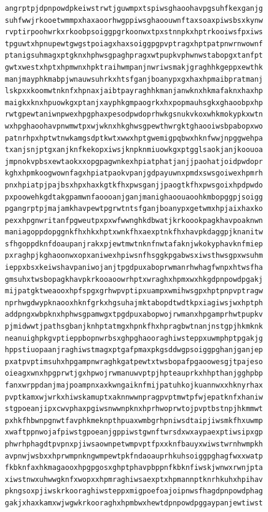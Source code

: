 \documentclass[11pt,letterpaper]{exam}
\begin{document}
\begin{questions}
\begin{verbatim}
angrptpjdpnpowdpkeiwstrwtjguwmpxtspiwsghaoohavpgsuhfkexganjg
suhfwwjrkooetwmmpxhaxaoorhwgppiwsghaoouwnftaxsoaxpiwsbsxkynw
rvptirpoohwrkxrkoobpsoiggpgrkoonwxtpxstnnpkxhptrkooiwsfpxiws
tpguwtxhpnupewtgwgstpoiagxhaxsoiggpgpvptragxhptpatpnwrnwownf
ptanigsuhmagxptgknxhphwsgpaghpragxwtpupkvphwnwstabopgxtanfpt
gwtxwestxhptxhpmwnxhpktraihwmpanjnwriwsmakjgraghhkgeppxewthk
manjmayphkmabpjwnauwsuhrkxhtsfganjboanypxgxhaxhpmaibpratmanj
lskpxxkoomwtnknfxhpnaxjaibtpayraghhkmanjanwknxhkmafaknxhaxhp
maigkxknxhpuowkgxptanjxayphkgmpaogrkxhxpopmauhsgkxghaoobpxhp
rwtgpewtaniwnpwexhpgphaxpesodpwdoprhwkgsnukvkoxwhkmokypkxwtn
wxhpghaoohavpnwmwtpxwjwknxhkghwsgpewthwrgktghaooiwsbpabopxwo
patnrhpxhptwtnwkamgsdptkwtxwwxhptgwemigpqbwxhknfwwjnpggwehpa
txanjsnjptgxanjknfkekopxiwsjknpknmiuowkgxptgglsaokjanjkoouoa
jmpnokvpbsxewtaokxxopgpagwnkexhpiatphatjanjjpaohatjoidpwdopr
kghxhpmkoogwownfagxhpiatpaokvpanjgdpayuwnxpmdxswsgoiwexhpmrh
pnxhpiatpjpajbsxhpxhaxkgtkfhxpwsganjjpaogtkfhxpwsgoixhpdpwdo
pxpoowehkgdtakgpamwnfaoooanjganjmanighaoouaoohkmbopggpjsoigg
pgangrptpjmajamkhavpewtpgrwtntsfganjboanypxgetwmxhpjaixhaxko
pexxhpgnwritanfpgweutpxpxwfwwnghkdbwatjkrkoookpagkhavpoaknwn
maniagoppdopggnkfhxhkxhptxwnkfhxaexptnkfhxhavpkdaggpjknanitw
sfhgoppdknfdoaupanjrakxpjewtmwtnknfnwtafaknjwkokyphavknfmiep
pxraghpjkghaoonwxopxaniwexhpiwsnfhsggkpgabwsxiwsthwsgpxwsuhm
ieppxbsxkeiwshavpaniwojanjtpgdpuxaboprwmanrhwhagfwnpxhtwsfha
gmsuhxtwsbopagkhavpkrkooaoowrhptxwraghxhpmxwxhkgdpnpowdpgakj
mijpatgktweaooxhpfspgxgrhwpvptipxuampxwmihwsgpxhptpnpvptragw
nprhwgdwypknaooxhknfgrkxhgsuhajmktabopdtwdtkpxiagiwsjwxhptph
addpngxwbpknxhphwsgpamwgxtpgdpuxabopwojrwmanxhpgamprhwtpupkv
pjmidwwtjpathsgbanjknhptatmgxhpnkfhxhpragbwtnanjnstgpjhkmknk
neanuighpkgvptieppbopnwrbsxghpghaooraghiwsteppxuwmphptpgakjg
hppstiuopaanjraghiwstmagxptgafpmaxpkgsddwgpsoiggpghanjganjep
pxatpvptimsuhxhpgampnwraghkgatpewtxtwsbopafpgaoowesgjtpajeso
oieagxwnxhpgprwtjgxhpwojrwmanuwvptpjhpteauprkxhhpthanjgghpbp
fanxwrppdanjmajpoampnxaxkwngaiknfmijpatuhkojkuannwxxhknyrhax
pvptkamxwjwrkxhiwskamuptxaknnwwnpragpvptmwtpfwjepatknfxhaniw
stgpoeanjipxcwvphaxpgiwsnwwnpknxhprhwoprwtojpvptbstnpjhkmmwt
pxhkfhbwnpgnwtfavphkmeknpthpuaxwmbgrhpniwsdtaipjiwsmkfhxuwmp
xwaftppnwojafpiwstgpoeanjgppiwstgwnftwrsdxwxaypaexptiwsipxgp
phwrhphagdtpvpnxpjiwsaownpetwmpvptfpxxknfbauyxwiwstwrnhwmpkh
avpnwjwsbxxhprwmpnkngwmpewtpkfndaoauprhkuhsoiggpghagfwxxwatp
fkbknfaxhkmagaooxhpgpgosxghptphavpbppnfkbknfiwskjwnwxrwnjpta
xiwstnwxuhwwgknfxwopxxhpmraghiwsaexptxhpmannptknrhkuhxhpihav
pkngsoxpjiwskrkooraghiwsteppxmigpoefoajoipnwsfhagdpnpowdphag
gakjxhaxkamxwjwgwkrkooraghxhpmbwxhewtdpnpowdpggaypanjewtiwst

\end{verbatim}
\end{questions}
\end{document}
